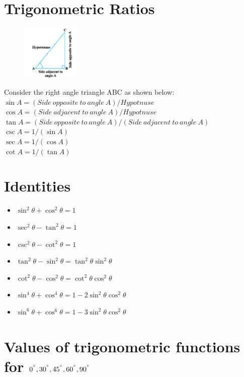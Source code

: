 \documentclass{book}
\begin{document}
	\section{Trigonometric Ratios}
	 \begin{figure}
	 	\includegraphics[scale=0.9,width=0.25\textwidth]{rat1}
	 \end{figure}
	Consider the right angle triangle ABC as shown below: \\
	 $\sin A = (Side \: opposite \:  to \: angle \: A) / Hypotnuse$ \\
	 $\cos A =(Side \: adjacent \: to \: angle \: A) / Hypotnuse$ \\
	 $\tan A = (Side \: opposite \: to \: angle \: A) / (Side \: adjacent\: to\: angle\: A)$ \\
	 $\csc A = 1 / (\sin A)$ \\
	 $\sec A = 1/(\cos A)$ \\
	 $\cot A = 1/(\tan A)$ \\
	 \section{Identities}
	 \begin{mdframed}[backgroundcolor=yellow]
		\begin{itemize}
			\item $\sin^2\theta + \cos^2\theta = 1$
			\item $\sec^2\theta - \tan^2\theta = 1$
			\item $\csc^2\theta - \cot^2\theta = 1$
			\item $\tan^2\theta - \sin^2\theta = \tan^2\theta\sin^2\theta$
			\item $\cot^2\theta - \cos^2\theta = \cot^2\theta\cos^2\theta$
			\item $\sin^4\theta + \cos^4\theta = 1-2\sin^2\theta\cos^2\theta$
			\item $\sin^6\theta + \cos^6\theta = 1 -3\sin^2\theta\cos^2\theta$
		\end{itemize}
	 \end{mdframed}
	 

	
	 
	 \section{Values of trigonometric functions for $0^{\degree}, 30^{\degree}, 45^{\degree},60^{\degree},90^{\degree}$}
	 
\end{document}
